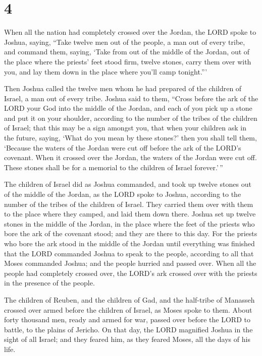 \hypertarget{section-3}{%
\section{4}\label{section-3}}

 When all the nation had completely crossed over the
Jordan, the LORD spoke to Joshua, saying,  ``Take twelve
men out of the people, a man out of every tribe,  and
command them, saying, `Take from out of the middle of the Jordan, out of
the place where the priests' feet stood firm, twelve stones, carry them
over with you, and lay them down in the place where you'll camp
tonight.'''

 Then Joshua called the twelve men whom he had prepared of
the children of Israel, a man out of every tribe.  Joshua
said to them, ``Cross before the ark of the LORD your God into the
middle of the Jordan, and each of you pick up a stone and put it on your
shoulder, according to the number of the tribes of the children of
Israel;  that this may be a sign amongst you, that when
your children ask in the future, saying, `What do you mean by these
stones?'  then you shall tell them, `Because the waters of
the Jordan were cut off before the ark of the LORD's covenant. When it
crossed over the Jordan, the waters of the Jordan were cut off. These
stones shall be for a memorial to the children of Israel forever.'\,''

 The children of Israel did as Joshua commanded, and took
up twelve stones out of the middle of the Jordan, as the LORD spoke to
Joshua, according to the number of the tribes of the children of Israel.
They carried them over with them to the place where they camped, and
laid them down there.  Joshua set up twelve stones in the
middle of the Jordan, in the place where the feet of the priests who
bore the ark of the covenant stood; and they are there to this day.
 For the priests who bore the ark stood in the middle of
the Jordan until everything was finished that the LORD commanded Joshua
to speak to the people, according to all that Moses commanded Joshua;
and the people hurried and passed over.  When all the
people had completely crossed over, the LORD's ark crossed over with the
priests in the presence of the people.

 The children of Reuben, and the children of Gad, and the
half-tribe of Manasseh crossed over armed before the children of Israel,
as Moses spoke to them.  About forty thousand men, ready
and armed for war, passed over before the LORD to battle, to the plains
of Jericho.  On that day, the LORD magnified Joshua in
the sight of all Israel; and they feared him, as they feared Moses, all
the days of his life.

